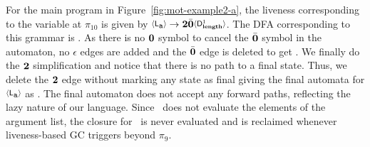 %
For the main  program in Figure~\ref{fig:mot-example2-a}, the liveness corresponding
to  the  variable   \var{\Lanv{\pa}{}} at $\pi_{10}$ is given by 
$\var{\Lanv{\pa}{}} \rightarrow \clazy \bcar \var{\Df{\length}{1}}$.
The  DFA   corresponding to this grammar is 
\dfaE. 
As there is no $\mathbf{0}$ symbol to cancel the $\bar{\mathbf{0}}$ symbol in the automaton, no 
$\epsilon$ edges are added and the $\bar{\mathbf{0}}$ edge is deleted to get 
\dfaF.
We finally do the ${\mathbf{2}}$ simplification and notice that there is no path to a final state. 
Thus, we delete the ${\mathbf{2}}$ edge without marking any state as final giving the final automata for 
$\var{\Lanv{\pa}{}}$ as 
\dfaG.
The final automaton does not
accept any forward paths, reflecting  the lazy nature of our language.
Since
\length\ does not  evaluate the elements of  the argument list,
the  closure for  \pa\ is  never evaluated  and is  reclaimed whenever
liveness-based GC triggers beyond $\pi_9$.


 



